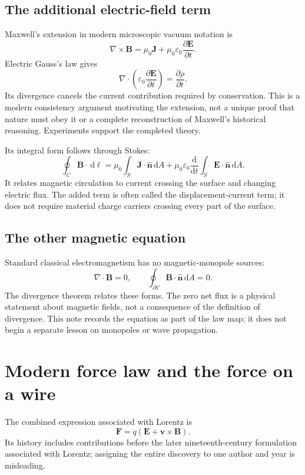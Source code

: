 \documentclass[11pt,letterpaper]{article}
\newcommand{\vect}[1]{\boldsymbol{#1}}
\newcommand{\dd}{\,\mathrm d}
\begin{document}
\subsection*{The additional electric-field term}
Maxwell's extension in modern microscopic vacuum notation is
\begin{equation}
\boxed{\nabla\times\vect B=\mu_0\vect J
+\mu_0\varepsilon_0\frac{\partial\vect E}{\partial t}.}
\end{equation}
Electric Gauss's law gives
\[
\nabla\cdot\left(\varepsilon_0\frac{\partial\vect E}{\partial t}\right)
=\frac{\partial\rho}{\partial t}.
\]
Its divergence cancels the current contribution required by conservation. This is a modern consistency argument motivating the extension, not a unique proof that nature must obey it or a complete reconstruction of Maxwell's historical reasoning. Experiments support the completed theory.\cite{maxwell}

Its integral form follows through Stokes:
\begin{equation}
\oint_C\vect B\cdot\dd\vect\ell
=\mu_0\int_S\vect J\cdot\hat{\vect n}\dd A
+\mu_0\varepsilon_0\frac{\mathrm d}{\mathrm dt}\int_S\vect E\cdot\hat{\vect n}\dd A.
\end{equation}
It relates magnetic circulation to current crossing the surface and changing electric flux. The added term is often called the displacement-current term; it does not require material charge carriers crossing every part of the surface.

\subsection*{The other magnetic equation}
Standard classical electromagnetism has no magnetic-monopole sources:
\begin{equation}
\boxed{\nabla\cdot\vect B=0,\qquad
\oint_{\partial V}\vect B\cdot\hat{\vect n}\dd A=0.}
\end{equation}
The divergence theorem relates these forms. The zero net flux is a physical statement about magnetic fields, not a consequence of the definition of divergence. This note records the equation as part of the law map; it does not begin a separate lesson on monopoles or wave propagation.

\newpage
\section{Modern force law and the force on a wire}
The combined expression associated with Lorentz is
\begin{equation}
\boxed{\vect F=q(\vect E+\vect v\times\vect B).}
\end{equation}
Its history includes contributions before the later nineteenth-century formulation associated with Lorentz; assigning the entire discovery to one author and year is misleading.\cite{forcehistory}
\end{document}
